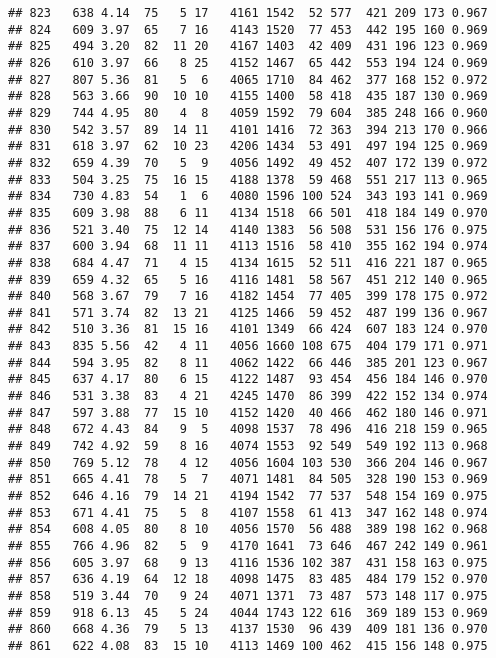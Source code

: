 \documentclass[]{article}
\begin{document}
\begin{verbatim}
## 823   638 4.14  75   5 17   4161 1542  52 577  421 209 173 0.967
## 824   609 3.97  65   7 16   4143 1520  77 453  442 195 160 0.969
## 825   494 3.20  82  11 20   4167 1403  42 409  431 196 123 0.969
## 826   610 3.97  66   8 25   4152 1467  65 442  553 194 124 0.969
## 827   807 5.36  81   5  6   4065 1710  84 462  377 168 152 0.972
## 828   563 3.66  90  10 10   4155 1400  58 418  435 187 130 0.969
## 829   744 4.95  80   4  8   4059 1592  79 604  385 248 166 0.960
## 830   542 3.57  89  14 11   4101 1416  72 363  394 213 170 0.966
## 831   618 3.97  62  10 23   4206 1434  53 491  497 194 125 0.969
## 832   659 4.39  70   5  9   4056 1492  49 452  407 172 139 0.972
## 833   504 3.25  75  16 15   4188 1378  59 468  551 217 113 0.965
## 834   730 4.83  54   1  6   4080 1596 100 524  343 193 141 0.969
## 835   609 3.98  88   6 11   4134 1518  66 501  418 184 149 0.970
## 836   521 3.40  75  12 14   4140 1383  56 508  531 156 176 0.975
## 837   600 3.94  68  11 11   4113 1516  58 410  355 162 194 0.974
## 838   684 4.47  71   4 15   4134 1615  52 511  416 221 187 0.965
## 839   659 4.32  65   5 16   4116 1481  58 567  451 212 140 0.965
## 840   568 3.67  79   7 16   4182 1454  77 405  399 178 175 0.972
## 841   571 3.74  82  13 21   4125 1466  59 452  487 199 136 0.967
## 842   510 3.36  81  15 16   4101 1349  66 424  607 183 124 0.970
## 843   835 5.56  42   4 11   4056 1660 108 675  404 179 171 0.971
## 844   594 3.95  82   8 11   4062 1422  66 446  385 201 123 0.967
## 845   637 4.17  80   6 15   4122 1487  93 454  456 184 146 0.970
## 846   531 3.38  83   4 21   4245 1470  86 399  422 152 134 0.974
## 847   597 3.88  77  15 10   4152 1420  40 466  462 180 146 0.971
## 848   672 4.43  84   9  5   4098 1537  78 496  416 218 159 0.965
## 849   742 4.92  59   8 16   4074 1553  92 549  549 192 113 0.968
## 850   769 5.12  78   4 12   4056 1604 103 530  366 204 146 0.967
## 851   665 4.41  78   5  7   4071 1481  84 505  328 190 153 0.969
## 852   646 4.16  79  14 21   4194 1542  77 537  548 154 169 0.975
## 853   671 4.41  75   5  8   4107 1558  61 413  347 162 148 0.974
## 854   608 4.05  80   8 10   4056 1570  56 488  389 198 162 0.968
## 855   766 4.96  82   5  9   4170 1641  73 646  467 242 149 0.961
## 856   605 3.97  68   9 13   4116 1536 102 387  431 158 163 0.975
## 857   636 4.19  64  12 18   4098 1475  83 485  484 179 152 0.970
## 858   519 3.44  70   9 24   4071 1371  73 487  573 148 117 0.975
## 859   918 6.13  45   5 24   4044 1743 122 616  369 189 153 0.969
## 860   668 4.36  79   5 13   4137 1530  96 439  409 181 136 0.970
## 861   622 4.08  83  15 10   4113 1469 100 462  415 156 148 0.975

\end{verbatim}
\end{document}
